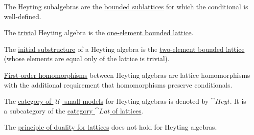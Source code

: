 \begin{definition}
\begin{thmenum}[resume=def:heyting_algebra]
     The Heyting subalgebras are the \hyperref[def:semilattice/submodel]{bounded sublattices} for which the conditional is well-defined.

     The \hyperref[rem:trivial_structure]{trivial} Heyting algebra is the \hyperref[def:semilattice/trivial]{one-element bounded lattice}.

     The \hyperref[thm:substructures_form_complete_lattice/bottom]{initial substructure} of a Heyting algebra is the \hyperref[def:semilattice/trivial]{two-element bounded lattice} (whose elements are equal only of the lattice is trivial).

     \hyperref[def:first_order_homomorphism]{First-order homomorphisms} between Heyting algebras are lattice homomorphisms with the additional requirement that homomorphisms preserve conditionals.

     The \hyperref[def:category_of_small_first_order_models]{category of \( \mscrU \)-small models} for Heyting algebras is denoted by \( \cat{Heyt} \). It is a subcategory of the \hyperref[def:semilattice/category]{category \( \cat{Lat} \) of lattices}.

     The \hyperref[def:semilattice/duality]{principle of duality for lattices} does not hold for Heyting algebras.
  \end{thmenum}
\end{definition}

